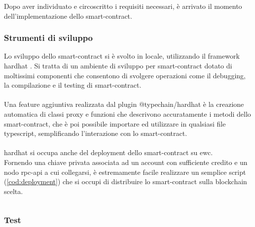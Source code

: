 Dopo aver individuato e circoscritto i requisiti necessari, è arrivato il momento dell'implementazione dello \gls{smart-contract}.

\subsubsection{Strumenti di sviluppo}

Lo sviluppo dello \gls{smart-contract} si è svolto in locale, utilizzando il framework hardhat \cite{soft:hardhat}.
Si tratta di un ambiente di sviluppo per \gls{smart-contract} dotato di moltissimi componenti
che consentono di svolgere operazioni come il debugging, la compilazione e il testing di \gls{smart-contract}. \\
\\
Una feature aggiuntiva realizzata dal plugin @typechain/hardhat \cite{soft:typechain_hardhat} è la creazione automatica di
classi proxy e funzioni che descrivono accuratamente i metodi dello \gls{smart-contract},
che è poi possibile importare ed utilizzare in qualsiasi file typescript, semplificando l'interazione con lo \gls{smart-contract}. \\
\\
hardhat si occupa anche del deployment dello \gls{smart-contract} su \gls{ewc}. \\
Fornendo una chiave privata associata ad un account con sufficiente credito e un nodo \gls{rpc-api} a cui collegarsi,
è estremamente facile realizzare un semplice script (\autoref{cod:deployment}) che si occupi di distribuire lo \gls{smart-contract} sulla blockchain scelta.

\inputminted{typescript}{../contracts/scripts/deployAggregatorContract.ts}

\subsubsection{Test}

